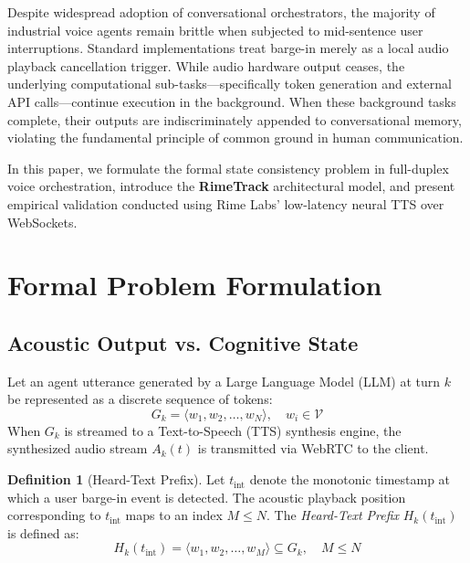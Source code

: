 \documentclass[10pt,journal,compsoc]{IEEEtran}
\theoremstyle{definition}
\newtheorem{definition}{Definition}
\begin{document}
Despite widespread adoption of conversational orchestrators, the majority of industrial voice agents remain brittle when subjected to mid-sentence user interruptions. Standard implementations treat barge-in merely as a local audio playback cancellation trigger. While audio hardware output ceases, the underlying computational sub-tasks---specifically token generation and external API calls---continue execution in the background. When these background tasks complete, their outputs are indiscriminately appended to conversational memory, violating the fundamental principle of common ground in human communication.

In this paper, we formulate the formal state consistency problem in full-duplex voice orchestration, introduce the \textbf{RimeTrack} architectural model, and present empirical validation conducted using Rime Labs' low-latency neural TTS over WebSockets.

\section{Formal Problem Formulation}

\subsection{Acoustic Output vs. Cognitive State}
Let an agent utterance generated by a Large Language Model (LLM) at turn $k$ be represented as a discrete sequence of tokens:
\begin{equation}
G_k = \langle w_1, w_2, \dots, w_N \rangle, \quad w_i \in \mathcal{V}
\end{equation}
When $G_k$ is streamed to a Text-to-Speech (TTS) synthesis engine, the synthesized audio stream $A_k(t)$ is transmitted via WebRTC to the client.

\begin{definition}[Heard-Text Prefix]
Let $t_{\text{int}}$ denote the monotonic timestamp at which a user barge-in event is detected. The acoustic playback position corresponding to $t_{\text{int}}$ maps to an index $M \le N$. The \textit{Heard-Text Prefix} $H_k(t_{\text{int}})$ is defined as:
\begin{equation}
H_k(t_{\text{int}}) = \langle w_1, w_2, \dots, w_M \rangle \subseteq G_k, \quad M \le N
\end{equation}
\end{definition}
\end{document}
